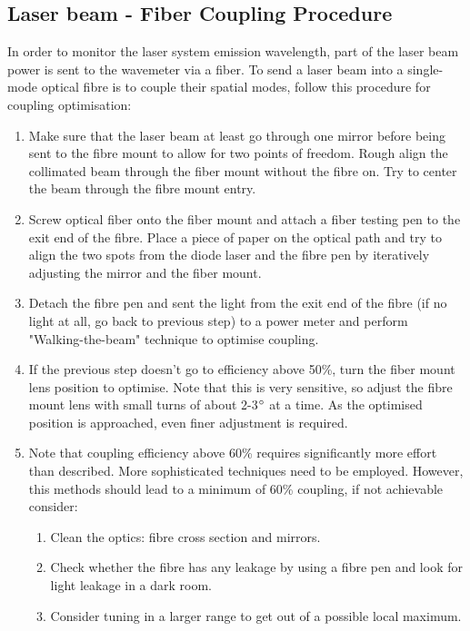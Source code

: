 \documentclass[12pt,A4Paper]{article}
\begin{document}
\subsection{Laser beam - Fiber Coupling Procedure}
In order to monitor the laser system emission wavelength, part of the laser beam power is sent to the wavemeter via a fiber. To send a laser beam into a single-mode optical fibre is to couple their spatial modes, follow this procedure for coupling optimisation: 
\begin{enumerate}
    \item Make sure that the laser beam at least go through one mirror before being sent to the fibre mount to allow for two points of freedom. Rough align the collimated beam through the fiber mount without the fibre on. Try to center the beam through the fibre mount entry. 
    \item Screw optical fiber onto the fiber mount and attach a fiber testing pen to the exit end of the fibre. Place a piece of paper on the optical path and try to align the two spots from the diode laser and the fibre pen by iteratively adjusting the mirror and the fiber mount. 
    \item Detach the fibre pen and sent the light from the exit end of the fibre (if no light at all, go back to previous step) to a power meter and perform "Walking-the-beam" technique \cite{WalkingTheBeamThorlabs} to optimise coupling. 
    \item If the previous step doesn't go to efficiency above 50\%, turn the fiber mount lens position to optimise. Note that this is very sensitive, so adjust the fibre mount lens with small turns of about 2-3$\degree$ at a time. As the optimised position is approached, even finer adjustment is required. 
    \item Note that coupling efficiency above 60\% requires significantly more effort than described. More sophisticated techniques need to be employed. However, this methods should lead to a minimum of 60\% coupling, if not achievable consider: 
    \begin{enumerate}
        \item Clean the optics: fibre cross section and mirrors.
        \item Check whether the fibre has any leakage by using a fibre pen and look for light leakage in a dark room. 
        \item Consider tuning in a larger range to get out of a possible local maximum. 
    \end{enumerate}
\end{enumerate}
\end{document}
